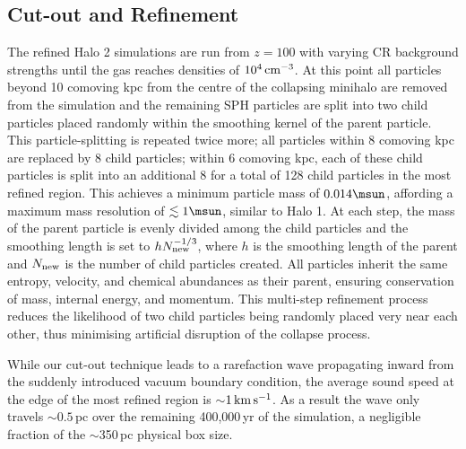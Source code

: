 \subsection{Cut-out and Refinement}
\label{cutout}

The refined Halo 2 simulations are run from $z=100$ with varying CR background strengths until the gas reaches densities of $10^4\,{\rm cm}^{-3}$.  At this point all particles beyond 10 comoving kpc from the centre of the collapsing minihalo are removed from the simulation and the remaining SPH particles are split into two child particles placed randomly within the smoothing kernel of the parent particle.  This particle-splitting is repeated twice more; all particles within 8 comoving kpc are replaced by 8 child particles; within 6 comoving kpc, each of these child particles is split into an additional 8 for a total of 128 child particles in the most refined region.  This achieves a minimum particle mass of $0.014\msun$, affording a maximum mass resolution of $\lesssim 1\msun$, similar to Halo 1.  At each step, the mass of the parent particle is evenly divided among the child particles and the smoothing length is set to $h N_{\rm new}^{-1/3}$, where $h$ is the smoothing length of the parent and $N_{\rm new}$ is the number of child particles created.  All particles inherit the same entropy, velocity, and chemical abundances as their parent, ensuring conservation of mass, internal energy, and momentum.  This multi-step refinement process reduces the likelihood of two child particles being randomly placed very near each other, thus minimising artificial disruption of the collapse process.

While our cut-out technique leads to a rarefaction wave propagating inward from the suddenly introduced vacuum boundary condition, the average sound speed at the edge of the most refined region is $\sim$$1\,{\rm km}\,{\rm s}^{-1}$.  As a result the wave only travels $\sim$$0.5\,$pc over the remaining 400,000$\,$yr of the simulation, a negligible fraction of the $\sim$350$\,$pc physical box size.